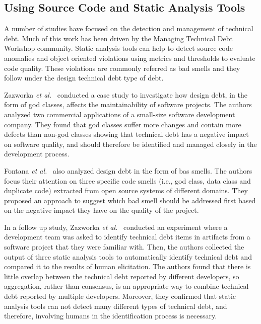 \subsection{Using Source Code and Static Analysis Tools}

A number of studies have focused on the detection and management of technical debt. Much of this work has been driven by the Managing Technical Debt Workshop community. Static analysis tools can help to detect source code anomalies and object oriented violations using metrics and thresholds to evaluate code quality. These violations are commonly referred as bad smells and they follow under the design technical debt type of debt. 

Zazworka \textit{et al.}~\cite{Zazworka2011MTD} conducted a case study to investigate how design debt, in the form of god classes, affects the maintainability of software projects. The authors analyzed two commercial applications of a small-size software development company. They found that god classes suffer more changes and contain more defects than non-god classes showing that technical debt has a negative impact on software quality, and should therefore be identified and managed closely in the development process.

Fontana \textit{et al.}~\cite{Fontana2012MTD} also analyzed design debt in the form of bas smells. The authors focus their attention on three specific code smells (i.e., god class, data class and duplicate code) extracted from open source systems of different domains. They proposed an approach to suggest which bad smell should be addressed first based on the negative impact they have on the quality of the project.

In a follow up study, Zazworka \textit{et al.}~\cite{Zazworka2013CSE} conducted an experiment where a development team was asked to identify technical debt items in artifacts from a software project that they were familiar with. Then, the authors collected the output of three static analysis tools to automatically identify technical debt and compared it to the results of human elicitation. The authors found that there is little overlap between the technical debt reported by different developers, so aggregation, rather than consensus, is an appropriate way to combine technical debt reported by multiple developers. Moreover, they confirmed that static analysis tools can not detect many different types of technical debt, and therefore, involving humans in the identification process is necessary. 

